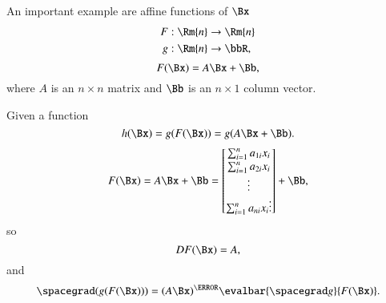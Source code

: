 An important example are affine functions of \( \Bx \)
%
\begin{equation}\label{eqn:jacobianAndHessian:744}
\begin{aligned}
F &: \Rm{n} \rightarrow \Rm{n} \\
g &: \Rm{n} \rightarrow \bbR,
\end{aligned}
\end{equation}
%
\begin{equation}\label{eqn:jacobianAndHessian:764}
F(\Bx) = A \Bx + \Bb,
\end{equation}
%
where \( A \) is an \( n \times n \) matrix and \( \Bb \) is an \( n \times 1 \) column vector.

Given a function
%
\begin{equation}\label{eqn:jacobianAndHessian:784}
h(\Bx) = g(F(\Bx)) = g(A \Bx + \Bb).
\end{equation}
%
\begin{equation}\label{eqn:jacobianAndHessian:804}
F(\Bx)
= A \Bx + \Bb
=
\begin{bmatrix}
\sum_{i = 1}^n a_{1i} x_i \\
\sum_{i = 1}^n a_{2i} x_i \\
\vdots \\
\sum_{i = 1}^n a_{ni} x_i
\vdots \\
\end{bmatrix}
+
\Bb
,
\end{equation}
%
so
%
\begin{equation}\label{eqn:jacobianAndHessian:824}
D F(\Bx) = A,
\end{equation}
%
and
\begin{equation}\label{eqn:jacobianAndHessian:1064}
\spacegrad (g(F(\Bx)))
=
(A \Bx)^\T
\evalbar{\spacegrad g}{F(\Bx)}.
\end{equation}
%
